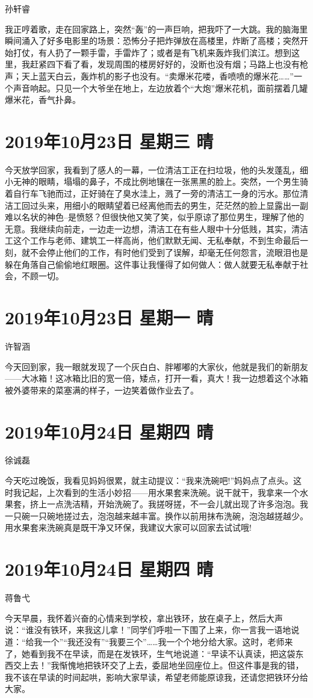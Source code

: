 孙轩睿

我正哼着歌，走在回家路上，突然``轰''的一声巨响，把我吓了一大跳。我的脑海里瞬间涌入了好多电影里的场景：恐怖分子把炸弹放在高楼里，炸断了高楼；突然开始打仗，有人扔了一颗手雷，手雷炸了；或者是有飞机来轰炸我们滨江。想到这里，我赶紧四下看了看，发现周围的楼房好好的，没断也没有烟；马路上也没有枪声；天上蓝天白云，轰炸机的影子也没有。``卖爆米花喽，香喷喷的爆米花\ldots\ldots{}''一个声音响起。只见一个大爷坐在地上，左边放着个``大炮''爆米花机，面前摆着几罐爆米花，香气扑鼻。

\section{2019年10月23日 星期三 晴}

今天放学回家，我看到了感人的一幕，一位清洁工正在扫垃圾，他的头发蓬乱，细小无神的眼睛，塌塌的鼻子，不成比例地镶在一张黑黑的脸上。突然，一个男生骑着自行车飞驰而过，正好骑在了臭水洼上，溅了一旁的清洁工一身的污水。那位清洁工回过头来，用细小的眼睛望着已经离他而去的男生，茫茫然的脸上显露出一副难以名状的神色--是愤怒？但很快他又笑了笑，似乎原谅了那位男生，理解了他的无意。我继续向前走，一边走一边想，清洁工在有些人眼中十分低贱，其实，清洁工这个工作与老师、建筑工一样高尚，他们默默无闻、无私奉献，不到生命最后一刻，就不会停止他们的工作，有时他们受到了误解，却毫无任何怨言，流眼泪也是躲在角落自己偷偷地红眼圈。这件事让我懂得了如何做人：做人就要无私奉献于社会，不顾一切。

\section{2019年10月23日 星期一 晴}

许智涵

今天回到家，我一眼就发现了一个灰白白、胖嘟嘟的大家伙，他就是我们的新朋友------大冰箱！这冰箱比旧的宽一倍，矮点，打开一看，真大！我一边想着这个冰箱被外婆带来的菜塞满的样子，一边笑着做作业去了。

\section{2019年10月24日 星期四 晴}

徐诚磊

今天吃过晚饭，我看见妈妈很累，就主动提议：``我来洗碗吧!''妈妈点了点头。这时我记起，上次看到的生活小妙招------用水果套来洗碗。说干就干，我拿来一个水果套，挤上一点洗洁精，开始洗碗了。我搓呀搓，不一会儿就出现了许多泡泡。我一只碗一只碗地搓过去，泡泡越来越丰富。换作以前用抹布洗碗，泡泡越搓越少。用水果套来洗碗真是既干净又环保，我建议大家可以回家去试试哦!

\section{2019年10月24日 星期四 晴}

蒋鲁弋

今天早晨，我怀着兴奋的心情来到学校，拿出铁环，放在桌子上，然后大声说：``谁没有铁环，来我这儿拿！''同学们呼啦一下围了上来，你一言我一语地说道：``给我一个''``我还没有''``我要三个''\ldots\ldots 我一个个地分给大家。这时，老师来了，她看到我不在早读，而是在发铁环，生气地说道：``早读不认真读，把这袋东西交上去！''我惭愧地把铁环交了上去，委屈地坐回座位上。但这件事是我的错，我不该在早读的时间起哄，影响大家早读，希望老师能原谅我，还请您把铁环分给大家。
